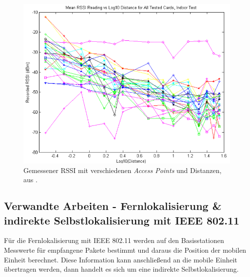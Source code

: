 \begin{figure}[h]
  \centering
	\includegraphics[width=\textwidth]{images/luiRSSI.png}
  \caption{Gemessener RSSI mit verschiedenen \emph{Access Points} und Distanzen, aus \cite{lui2011differences}.}
  \label{fig:luiRSSI}
\end{figure}




\subsection{Verwandte Arbeiten - Fernlokalisierung \& indirekte Selbstlokalisierung mit IEEE 802.11}
Für die Fernlokalisierung mit IEEE 802.11 werden auf den Basisstationen Messwerte für empfangene Pakete bestimmt und daraus die Position der mobilen Einheit berechnet.
Diese Information kann anschließend an die mobile Einheit übertragen werden, dann handelt es sich um eine indirekte Selbstlokalisierung.

